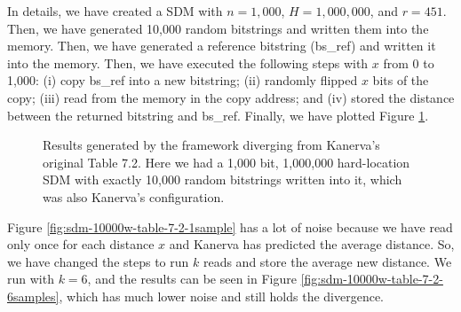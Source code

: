 In details, we have created a SDM with $n=1,000$, $H=1,000,000$, and $r=451$. Then, we have generated 10,000 random bitstrings and written them into the memory. Then, we have generated a reference bitstring (bs\_ref) and written it into the memory. Then, we have executed the following steps with $x$ from 0 to 1,000: (i) copy bs\_ref into a new bitstring; (ii) randomly flipped $x$ bits of the copy; (iii) read from the memory in the copy address; and (iv) stored the distance between the returned bitstring and bs\_ref. Finally, we have plotted Figure \ref{fig:sdm-10000w-table-7-2}.

\begin{figure}[h]
\centering
{}

\caption{Results generated by the framework diverging from Kanerva's original Table 7.2. Here we had a 1,000 bit, 1,000,000 hard-location SDM with exactly 10,000 random bitstrings written into it, which was also Kanerva's configuration.
\label{fig:sdm-10000w-table-7-2}}
\end{figure}

Figure \ref{fig:sdm-10000w-table-7-2-1sample} has a lot of noise because we have read only once for each distance $x$ and Kanerva has predicted the average distance. So, we have changed the steps to run $k$ reads and store the average new distance. We run with $k=6$, and the results can be seen in Figure \ref{fig:sdm-10000w-table-7-2-6samples}, which has much lower noise and still holds the divergence.

